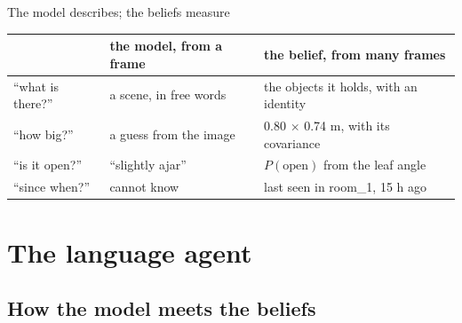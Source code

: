\documentclass[10pt, aspectratio=169]{beamer}
\begin{document}
\begin{frame}{The model describes; the beliefs measure}
  \centering\small
  \renewcommand{\arraystretch}{1.4}
  \begin{tabular}{@{}p{3.1cm} p{5.0cm} p{5.6cm}@{}}
    \toprule
     & the model, from a frame & the belief, from many frames \\
    \midrule
    ``what is there?'' & a scene, in free words & the objects it holds, with an identity \\
    ``how big?'' & a guess from the image & 0.80 $\times$ 0.74 m, with its covariance \\
    ``is it open?'' & ``slightly ajar'' & $P(\text{open})$ from the leaf angle \\
    ``since when?'' & cannot know & last seen in room\_1, 15 h ago \\
    \bottomrule
  \end{tabular}
\end{frame}

\section{The language agent}

\subsection{How the model meets the beliefs}
\end{document}
